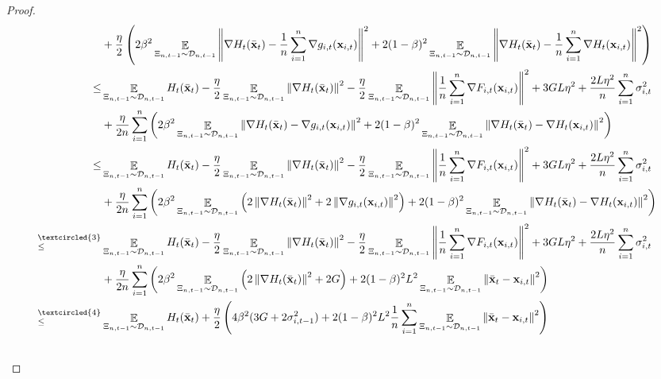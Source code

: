 \documentclass{article}
\begin{document}
\begin{proof}
\begin{align}
& + \frac{\eta}{2}\lrincir{2\beta^2\EE_{ \Xi_{n,t-1} \sim \Dcal_{n,t-1} }\lrnorm{\nabla H_t(\bar{\x}_t) -\frac{1}{n}\sum_{i=1}^n \nabla g_{i,t}(\x_{i,t})}^2 + 2(1-\beta)^2\EE_{ \Xi_{n,t-1} \sim \Dcal_{n,t-1} }\lrnorm{\nabla H_t(\bar{\x}_t) -\frac{1}{n}\sum_{i=1}^n \nabla H_t(\x_{i,t})}^2  }  \\ \nonumber
\le & \EE_{ \Xi_{n,t-1} \sim \Dcal_{n,t-1} } H_t(\bar{\x}_t) - \frac{\eta}{2}\EE_{ \Xi_{n,t-1} \sim \Dcal_{n,t-1} }\lrnorm{\nabla H_t(\bar{\x}_t)}^2 - \frac{\eta}{2}\EE_{ \Xi_{n,t-1} \sim \Dcal_{n,t-1} }\lrnorm{\frac{1}{n}\sum_{i=1}^n \nabla F_{i,t}(\x_{i,t})}^2  + 3GL\eta^2  + \frac{2L\eta^2}{n}\sum_{i=1}^n \sigma_{i,t}^2 \\ \nonumber
& + \frac{\eta}{2n}\sum_{i=1}^n\lrincir{2\beta^2\EE_{ \Xi_{n,t-1} \sim \Dcal_{n,t-1} }\lrnorm{\nabla H_t(\bar{\x}_t) - \nabla g_{i,t}(\x_{i,t})}^2 + 2(1-\beta)^2\EE_{ \Xi_{n,t-1} \sim \Dcal_{n,t-1} }\lrnorm{\nabla H_t(\bar{\x}_t) - \nabla H_t(\x_{i,t})}^2  }  \\ \nonumber
\le & \EE_{ \Xi_{n,t-1} \sim \Dcal_{n,t-1} } H_t(\bar{\x}_t) - \frac{\eta}{2}\EE_{ \Xi_{n,t-1} \sim \Dcal_{n,t-1} }\lrnorm{\nabla H_t(\bar{\x}_t)}^2 - \frac{\eta}{2}\EE_{ \Xi_{n,t-1} \sim \Dcal_{n,t-1} }\lrnorm{\frac{1}{n}\sum_{i=1}^n \nabla F_{i,t}(\x_{i,t})}^2  + 3GL\eta^2  + \frac{2L\eta^2}{n}\sum_{i=1}^n \sigma_{i,t}^2 \\ \nonumber
& + \frac{\eta}{2n}\sum_{i=1}^n\lrincir{2\beta^2\EE_{ \Xi_{n,t-1} \sim \Dcal_{n,t-1} }\lrincir{2\lrnorm{\nabla H_t(\bar{\x}_t) }^2 + 2\lrnorm{\nabla g_{i,t}(\x_{i,t})}^2} + 2(1-\beta)^2\EE_{ \Xi_{n,t-1} \sim \Dcal_{n,t-1} }\lrnorm{\nabla H_t(\bar{\x}_t) - \nabla H_t(\x_{i,t})}^2  }  \\ \nonumber
\refabovecir{\le}{\textcircled{3}} & \EE_{ \Xi_{n,t-1} \sim \Dcal_{n,t-1} } H_t(\bar{\x}_t) - \frac{\eta}{2}\EE_{ \Xi_{n,t-1} \sim \Dcal_{n,t-1} }\lrnorm{\nabla H_t(\bar{\x}_t)}^2 - \frac{\eta}{2}\EE_{ \Xi_{n,t-1} \sim \Dcal_{n,t-1} }\lrnorm{\frac{1}{n}\sum_{i=1}^n \nabla F_{i,t}(\x_{i,t})}^2  + 3GL\eta^2  + \frac{2L\eta^2}{n}\sum_{i=1}^n \sigma_{i,t}^2 \\ \nonumber
& + \frac{\eta}{2n}\sum_{i=1}^n\lrincir{2\beta^2\EE_{ \Xi_{n,t-1} \sim \Dcal_{n,t-1} }\lrincir{2\lrnorm{\nabla H_t(\bar{\x}_t) }^2 + 2G} + 2(1-\beta)^2 L^2\EE_{ \Xi_{n,t-1} \sim \Dcal_{n,t-1} }\lrnorm{ \bar{\x}_t - \x_{i,t} }^2  }  \\ \nonumber
\refabovecir{\le}{\textcircled{4}} & \EE_{ \Xi_{n,t-1} \sim \Dcal_{n,t-1} }H_t(\bar{\x}_t) + \frac{\eta}{2}\lrincir{4\beta^2 (3G + 2\sigma_{i,t-1}^2) + 2(1-\beta)^2 L^2\frac{1}{n}\sum_{i=1}^n \EE_{ \Xi_{n,t-1} \sim \Dcal_{n,t-1} }\lrnorm{\bar{\x}_t -\x_{i,t}}^2  }  \\ \nonumber 

\end{align}
\end{proof}
\end{document}
